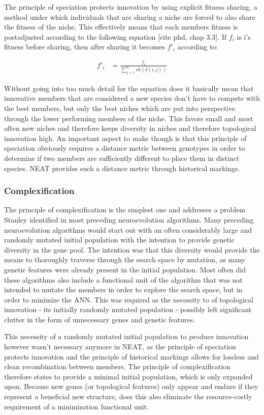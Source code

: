 \documentclass[journal, a4paper]{IEEEtran}
\begin{document}
The principle of speciation protects innovation by using explicit fitness sharing, a method under which individuals that are sharing a niche are forced to also share the fitness of the niche. This effectively means that each members fitness is postadjusted according to the following equation [cite phd, chap 3.3]. If $f_i$ is i's fitness before sharing, then after sharing it becomes $f'_i$ according to:

\begin{align}
    f'_i &= \frac{f_i}{\sum_{j=1}^{n} sh(\delta(i,j))}
\end{align}

Without going into too much detail for the equation does it basically mean that innovative members that are considered a new species don't have to compete with the best members, but only the best niches which are put into perspective through the lower performing members of the niche. This favors small and most often new niches and therefore keeps diversity in niches and therefore topological innovation high. An important aspect to make though is that this principle of speciation obviously requires a distance metric between genotypes in order to determine if two members are sufficiently different to place them in distinct species. NEAT provides such a distance metric through historical markings.



\subsubsection{Complexification}
The principle of complexification is the simplest one and addresses a problem Stanley identified in most preceding neuroevolution algorithms. Many preceding neuroevolution algorithms would start out with an often considerably large and randomly mutated initial population with the intention to provide genetic diversity in the gene pool. The intention was that this diversity would provide the means to thoroughly traverse through the search space by mutation, as many genetic features were already present in the initial population. Most often did these algorithms also include a functional unit of the algorithm that was not intended to mutate the members in order to explore the search space, but in order to minimize the ANN. This was required as the necessity to of topological innovation - its initially randomly mutated population - possibly left significant clutter in the form of unnecessary genes and genetic features.

This necessity of a randomly mutated initial population to produce innovation however wasn't necessary anymore in NEAT, as the principle of speciation protects innovation and the principle of historical markings allows for lossless and clean recombination between members. The principle of complexification therefore states to provide a minimal initial population, which is only expanded upon. Because new genes (or topological features) only appear and endure if they represent a beneficial new structure, does this also eliminate the resource-costly requirement of a minimization functional unit.
\end{document}
